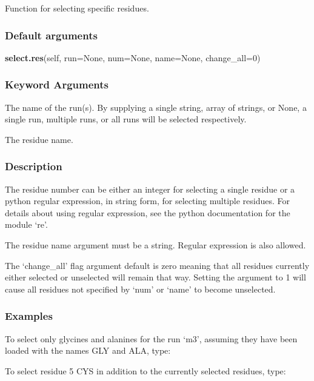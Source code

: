 Function for selecting specific residues.

\subsubsection{Default arguments}

\textsf{\textbf{select.res}(self, run=None, num=None, name=None, change\_all=0)}


\subsubsection{Keyword Arguments}

  The name of the run(s).  By supplying a single string, array of strings, or None, a single run, multiple runs, or all runs will be selected respectively.

  The residue name.


\subsubsection{Description}

The residue number can be either an integer for selecting a single residue or a python
regular expression, in string form, for selecting multiple residues.  For details about
using regular expression, see the python documentation for the module `re'.

The residue name argument must be a string.  Regular expression is also allowed.

The `change\_all' flag argument default is zero meaning that all residues currently either
selected or unselected will remain that way.  Setting the argument to 1 will cause all
residues not specified by `num' or `name' to become unselected.


\subsubsection{Examples}

To select only glycines and alanines for the run `m3', assuming they have been loaded with
the names GLY and ALA, type:


To select residue 5 CYS in addition to the currently selected residues, type:





